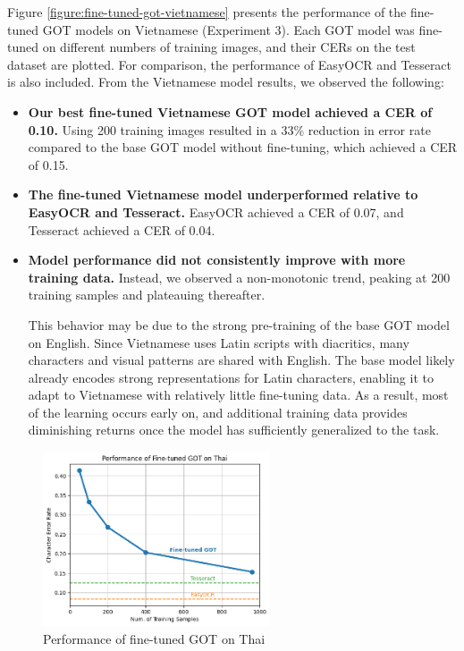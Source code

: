 \documentclass[12pt,oneside]{memoir}
\begin{document}
Figure \ref{figure:fine-tuned-got-vietnamese} presents the performance of the fine-tuned GOT models on Vietnamese (Experiment 3). 
Each GOT model was fine-tuned on different numbers of training images, and their CERs on the test dataset are plotted.
For comparison, the performance of EasyOCR and Tesseract is also included.
From the Vietnamese model results, we observed the following:

\begin{itemize}
    \item \textbf{Our best fine-tuned Vietnamese GOT model achieved a CER of 0.10.}
    Using 200 training images resulted in a 33\% reduction in error rate compared to the base GOT model without fine-tuning, which achieved a CER of 0.15.
    \item \textbf{The fine-tuned Vietnamese model underperformed relative to EasyOCR and Tesseract.} EasyOCR achieved a CER of 0.07, and Tesseract achieved a CER of 0.04.
    \item \textbf{Model performance did not consistently improve with more training data.} 
    Instead, we observed a non-monotonic trend, peaking at 200 training samples and plateauing thereafter.

    This behavior may be due to the strong pre-training of the base GOT model on English.
    Since Vietnamese uses Latin scripts with diacritics, many characters and visual patterns are shared with English.
    The base model likely already encodes strong representations for Latin characters, enabling it to adapt to Vietnamese with relatively little fine-tuning data.
    As a result, most of the learning occurs early on, and additional training data provides diminishing returns once the model has sufficiently generalized to the task.
\end{itemize}

\begin{figure}[ht]
    \centering
    \includegraphics[width=0.6\textwidth]{images/fine-tuned-got-thai.png}
    \caption{Performance of fine-tuned GOT on Thai}
    \label{figure:fine-tuned-got-thai}
\end{figure}
\end{document}
